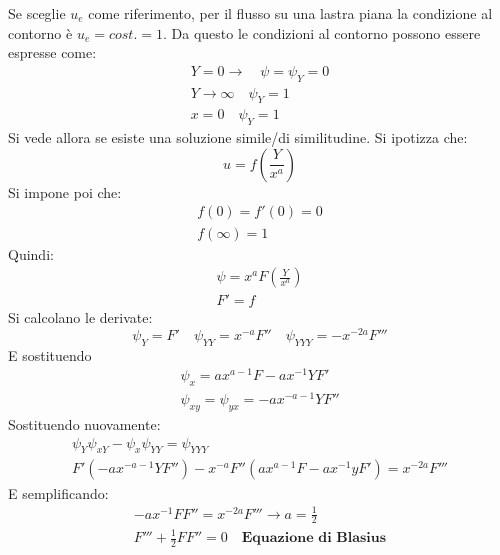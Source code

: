 Se sceglie $u_e$ come riferimento, per il flusso su una lastra piana la condizione al contorno è $u_e = cost. = 1$.
Da questo le condizioni al contorno possono essere espresse come:
%
	\begin{equation*}
		\begin{gathered}
			Y = 0 \rightarrow \quad \psi = \psi_Y = 0\\
			Y \rightarrow \infty \quad \psi_Y = 1\\
			x = 0 \quad \psi_Y = 1
		\end{gathered}
	\end{equation*}
%
Si vede allora se esiste una soluzione simile/di similitudine.
Si ipotizza che:
%
	\begin{equation*}
		u = f \left( \frac{Y}{x^a} \right)
	\end{equation*}
%	
Si impone poi che:
%
	\begin{equation*}
		\begin{gathered}
			f(0) = f'(0) = 0\\
			f(\infty) = 1 
		\end{gathered}
	\end{equation*}
%
Quindi:
%
	\begin{equation*}
		\begin{gathered}
			\psi = x^a F \left( \frac{Y}{x^a} \right)\\
			F' = f
		\end{gathered}
	\end{equation*}
%
Si calcolano le derivate:
%
	\begin{equation*}
		\psi_Y = F' \quad \psi_{YY} = x^{-a} F'' \quad \psi_{YYY} = -x^{-2a} F'''
	\end{equation*}
%
E sostituendo
%
	\begin{equation*}
		\begin{gathered}
			\psi_x = a x^{a-1} F - a x^{-1} Y F'\\
			\psi_{xy} = \psi_{yx} = - a x^{-a-1} Y F''
		\end{gathered}
	\end{equation*}
%
Sostituendo nuovamente:
%
	\begin{equation*}
		\begin{gathered}
			\psi_{Y} \psi_{xY} - \psi_{x} \psi_{YY} = \psi_{YYY}\\
			F' (-a x^{-a-1} Y F'') - x^{-a} F'' (a x^{a-1} F - a x^{-1} y F') = x^{-2a} F'''
		\end{gathered}
	\end{equation*}
%			
E semplificando:
%
	\begin{equation*}
		\begin{gathered}		
			-a x^{-1} F F'' = x^{-2a} F''' \rightarrow a = \frac{1}{2}\\
			F''' + \frac{1}{2} F F'' = 0 \quad \textbf{Equazione di Blasius}
		\end{gathered}
	\end{equation*}

